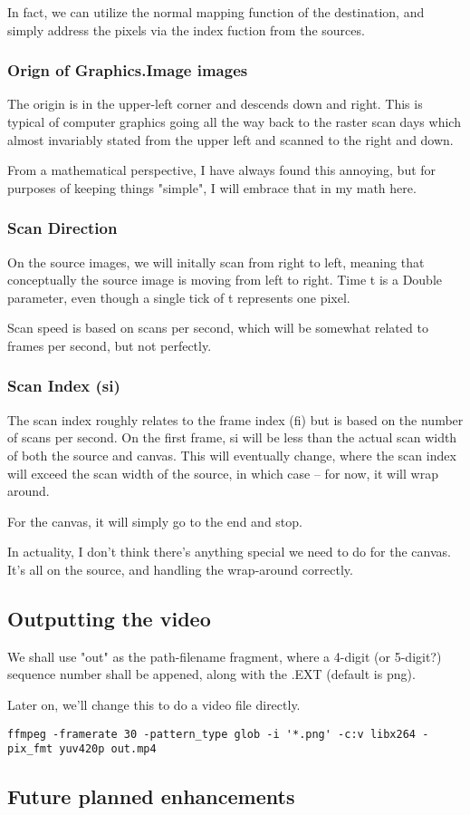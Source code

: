 \documentclass[letterpaper, 11pt]{article}
\begin{document}
In fact, we can utilize the normal mapping function of the destination, and 
simply address the pixels via the index fuction from the sources.

\subsubsection{Orign of Graphics.Image images}
\label{sec:org685b72d}
The origin is in the upper-left corner and descends down and right.
This is typical of computer graphics going all the way back to the raster scan
days which almost invariably stated from the upper left and scanned to the
right and down.

From a mathematical perspective, I have always found this annoying, but for
purposes of keeping things "simple", I will embrace that in my math here.
\subsubsection{Scan Direction}
\label{sec:org7d7a5fa}
On the source images, we will initally scan from right to left, meaning that
conceptually the source image is moving from left to right. Time t is a Double
parameter, even though a single tick of t represents one pixel.

Scan speed is based on scans per second, which will be somewhat related to 
frames per second, but not perfectly.

\subsubsection{Scan Index (si)}
\label{sec:org5119a73}
The scan index roughly relates to the frame index (fi) but is based
on the number of scans per second. On the first frame, si will be less than 
the actual scan width of both the source and canvas. This will eventually change,
where the scan index will exceed the scan width of the source, in which
case -- for now, it will wrap around.

For the canvas, it will simply go to the end and stop.

In actuality, I don't think there's anything special we need to do for the
canvas. It's all on the source, and handling the wrap-around correctly.

\subsection{Outputting the video}
\label{sec:orgee66f69}
We shall use "out" as the path-filename fragment, where
a 4-digit (or 5-digit?) sequence number shall be appened,
along with the .EXT (default is png).

Later on, we'll change this to do a video file directly. 

\begin{verbatim}
ffmpeg -framerate 30 -pattern_type glob -i '*.png' -c:v libx264 -pix_fmt yuv420p out.mp4
\end{verbatim}


\subsection{Future planned enhancements}
\label{sec:org372ce69}
\end{document}
